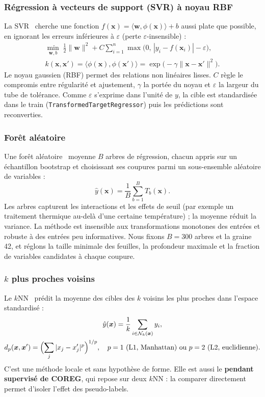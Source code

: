 \subsubsection{Régression à vecteurs de support (SVR) à noyau RBF}
La SVR~\cite{smola_2004} cherche une fonction $f(\bm{x}) = \langle \bm{w}, \phi(\bm{x})\rangle + b$
aussi \og plate \fg{} que possible, en ignorant les erreurs inférieures à
$\varepsilon$ (perte $\varepsilon$-insensible) :
\begin{gather}
  \min_{\bm{w}, b}\; \tfrac{1}{2}\lVert\bm{w}\rVert^2 + C\sum_{i=1}^{n}\max\bigl(0,\, |y_i - f(\bm{x}_i)| - \varepsilon\bigr), \\
  k(\bm{x},\bm{x}') = \langle\phi(\bm{x}),\phi(\bm{x}')\rangle = \exp\bigl(-\gamma\lVert\bm{x}-\bm{x}'\rVert^2\bigr).
\end{gather}
Le noyau gaussien (RBF) permet des relations non linéaires lisses. $C$ règle le
compromis entre régularité et ajustement, $\gamma$ la portée du noyau et
$\varepsilon$ la largeur du tube de tolérance. Comme $\varepsilon$ s'exprime dans
l'unité de $y$, la cible est standardisée dans le train
(\texttt{TransformedTargetRegressor}) puis les prédictions sont reconverties.

\subsubsection{Forêt aléatoire}
Une forêt aléatoire~\cite{breiman_2001} moyenne $B$ arbres de régression, chacun
appris sur un échantillon bootstrap et choisissant ses coupures parmi un
sous-ensemble aléatoire de variables :
\begin{equation}
  \hat{y}(\bm{x}) = \frac{1}{B}\sum_{b=1}^{B} T_b(\bm{x}).
\end{equation}
Les arbres capturent les interactions et les effets de seuil (par exemple un
traitement thermique au-delà d'une certaine température) ; la moyenne réduit la
variance. La méthode est insensible aux transformations monotones des entrées et
robuste à des entrées peu informatives. Nous fixons $B = 300$ arbres et la
graine 42, et réglons la taille minimale des feuilles, la profondeur maximale et
la fraction de variables candidates à chaque coupure.

\subsubsection{$k$ plus proches voisins}
Le $k$NN~\cite{cover_1967} prédit la moyenne des cibles des $k$ voisins les plus
proches dans l'espace standardisé :
\begin{gather}
  \hat{y}(\bm{x}) = \frac{1}{k}\sum_{i \in \mathcal{N}_k(\bm{x})} y_i, \\
  d_p(\bm{x},\bm{x}') = \Bigl(\sum_j |x_j - x'_j|^p\Bigr)^{1/p}, \quad p = 1 \text{ (L1, Manhattan) ou } p = 2 \text{ (L2, euclidienne)}.
\end{gather}
C'est une méthode locale et sans hypothèse de forme. Elle est aussi le
\textbf{pendant supervisé de COREG}, qui repose sur deux $k$NN : la comparer
directement permet d'isoler l'effet des pseudo-labels.

